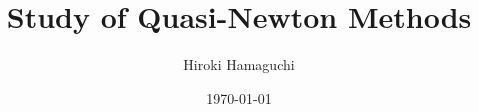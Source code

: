 \documentclass[dvipdfmx]{article}
\begin{document}
\title{Study of Quasi-Newton Methods}
\author{Hiroki Hamaguchi }
\date{\today}
\maketitle











\end{document}
